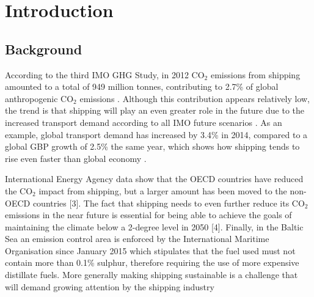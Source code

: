 \documentclass[preprint,12pt]{elsarticle}
\begin{document}






\section{Introduction} \label{sec:introduction}

\subsection{Background}

According to the third IMO GHG Study, in 2012 CO$_2$ emissions from shipping amounted to a total of 949 million tonnes, contributing to 2.7\% of global anthropogenic CO$_2$ emissions \cite{Smith2014}. Although this contribution appears relatively low, the trend is that shipping will play an even greater role in the future due to the increased transport demand according to all IMO future scenarios \cite{Smith2014}. As an example, global transport demand has increased by 3.4\% in 2014, compared to a global GBP growth of 2.5\% the same year, which shows how shipping tends to rise even faster than global economy \cite{UNCTAD2015}.

International Energy Agency data show that the OECD countries have reduced the CO$_2$ impact from shipping, but a larger amount has been moved to the non-OECD countries [3]. The fact that shipping needs to even further reduce its CO$_2$ emissions in the near future is essential for being able to achieve the goals of maintaining the climate below a 2-degree level in 2050 [4]. Finally, in the Baltic Sea an emission control area is enforced by the International Maritime Organisation since January 2015 which stipulates that the fuel used must not contain more than 0.1\% sulphur, therefore requiring the use of more expensive distillate fuels. More generally making shipping sustainable is a challenge that will demand growing attention by the shipping industry \cite{Andersson2016}
\end{document}
